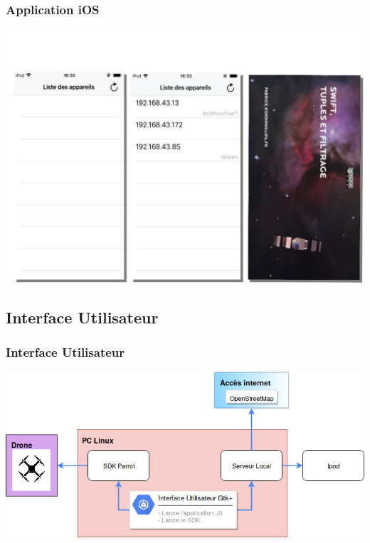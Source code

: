 \documentclass{beamer}
\begin{document}
	
	
	\begin{frame}
		\begin{center}
		\frametitle{Application iOS}
        \includegraphics[scale=0.37]{Architecture_logicielle_composants/ipod.png}
		\end{center}
	\end{frame}
	
	
	
	\begin{frame}
		\section{Interface Utilisateur}
		\begin{center}
		\frametitle{Interface Utilisateur}
        \includegraphics[scale=0.4]{Architecture_logicielle_composants/Interface_utilisateur.jpg}
		\end{center}
	\end{frame}
	
\end{document}
